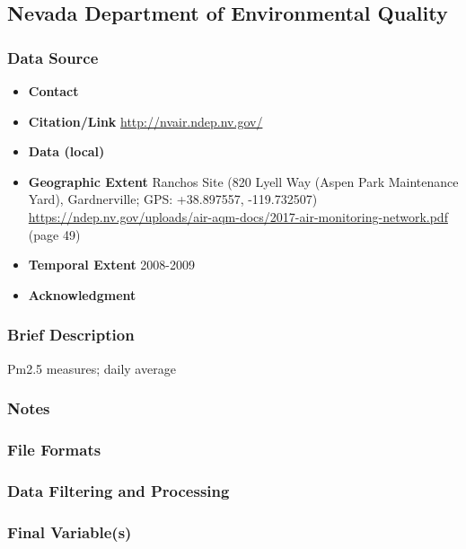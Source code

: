 \subsection{Nevada Department of Environmental Quality}

\subsubsection*{Data Source}

\begin{itemize}[nolistsep]
\item \textbf{Contact} 
\item \textbf{Citation/Link} \url{http://nvair.ndep.nv.gov/}
\item \textbf{Data (local)} 
\item \textbf{Geographic Extent} Ranchos Site (820 Lyell Way (Aspen Park Maintenance Yard), Gardnerville; GPS: +38.897557, -119.732507) \url{https://ndep.nv.gov/uploads/air-aqm-docs/2017-air-monitoring-network.pdf } (page 49)
\item \textbf{Temporal Extent} 2008-2009
\item \textbf{Acknowledgment} 
\end{itemize}

\subsubsection*{Brief Description}
Pm2.5 measures; daily average


\subsubsection*{Notes}

\subsubsection*{File Formats} 

\subsubsection*{Data Filtering and Processing}

\subsubsection*{Final Variable(s)}

